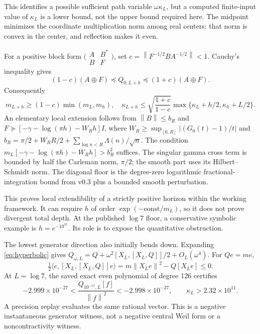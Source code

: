 \documentclass[11pt]{article}
\theoremstyle{remark}\newtheorem{remark}[theorem]{Remark}
\newcommand{\norm}[1]{\left\|#1\right\|}
\newcommand{\ip}[2]{\langle #1,#2\rangle}
\begin{document}
This identifies a possible sufficient path variable $\omega\kappa_L$, but a computed finite-input value of $\kappa_L$ is a lower bound, not the upper bound required here. The midpoint minimizes the coordinate multiplication norm among real centers: that norm is convex in the center, and reflection makes it even.

For a positive block form $\bigl(\begin{smallmatrix}A&B^*\\B&F\end{smallmatrix}\bigr)$, set $c=\norm{F^{-1/2}BA^{-1/2}}<1$. Cauchy's inequality gives
\begin{equation}\label{eq:basicblock}
 (1-c)(A\oplus F)\preceq Q_{0,L+h}\preceq(1+c)(A\oplus F).
\end{equation}
Consequently
\[
 m_{L+h}\ge(1-c)\min(m_L,m_h),\quad
 \kappa_{L+h}\le\sqrt{\frac{1+c}{1-c}}
 \max\{\kappa_L+h/2,\kappa_h+L/2\}.
\]
An elementary local extension follows from $\norm B\le b_R$ and
$F\succeq[-\gamma-\log(\pi h)-W_Rh]I$, where
$W_R\ge\sup_{[0,R]}|(G_0(t)-1)/t|$ and
$b_R=\pi/2+W_RR/2+\sum_{\log n<R}\Lambda(n)/\sqrt n$.
The condition $m_L[-\gamma-\log(\pi h)-W_Rh]>b_R^2$ suffices. The singular gamma cross term is bounded by half the Carleman norm, $\pi/2$; the smooth part uses its Hilbert--Schmidt norm. The diagonal floor is the degree-zero logarithmic fractional-integration bound from v0.3 plus a bounded smooth perturbation.

This proves local extendibility of a strictly positive horizon within the working framework. It can require $h$ of order $\exp(-\mathrm{const}/m_L)$, so it does not prove divergent total depth. At the published $\log7$ floor, a conservative symbolic example is $h=e^{-10^{31}}$. Its role is to expose the quantitative obstruction.

The lowest generator direction also initially bends down. Expanding \eqref{eq:hyperbolic} gives $Q_{\omega,L}=Q+\omega^2[X_L,[X_L,Q]]/2+O_L(\omega^4)$. For $Qe=me$,
\[
 \tfrac12\ip e{[X_L,[X_L,Q]]e}=m\norm{X_Le}^2-Q[X_Le]\le0.
\]
At $L=\log7$, the saved exact even polynomial of degree 126 certifies
\begin{equation}\label{eq:negative}
 -2.999\times10^{-27}<\frac{Q_{10^{-11},L}[f]}{\norm f^2}
 <-2.998\times10^{-27},\qquad \kappa_L>2.32\times10^{11}.
\end{equation}
A precision replay evaluates the same rational vector. This is a negative instantaneous generator witness, not a negative central Weil form or a noncontractivity witness.
\end{document}
